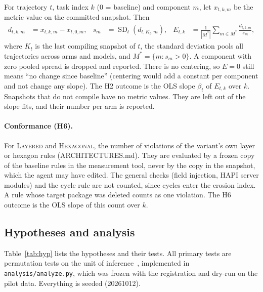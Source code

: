 \documentclass[10pt]{article}
\newcommand{\LAY}{\textsc{Layered}}
\newcommand{\HEX}{\textsc{Hexagonal}}
\newcommand{\code}[1]{\texttt{#1}}
\begin{document}
For trajectory $t$, task index $k$ (0 = baseline) and component $m$, let $x_{t,k,m}$ be the metric
value on the committed snapshot. Then
\begin{align}
d_{t,k,m} &= x_{t,k,m} - x_{t,0,m}, &
s_m &= \operatorname{SD}_t\!\left(d_{t,K_t,m}\right), &
E_{t,k} &= \frac{1}{|M^\ast|}\sum_{m\in M^\ast}\frac{d_{t,k,m}}{s_m},
\end{align}
where $K_t$ is the last compiling snapshot of $t$, the standard deviation pools all trajectories
across arms and models, and $M^\ast=\{m : s_m>0\}$. A component with zero pooled spread is dropped
and reported. There is no centering, so $E=0$ still means ``no change since baseline'' (centering
would add a constant per component and not change any slope). The H2 outcome is the OLS slope
$\beta_t$ of $E_{t,k}$ over $k$. Snapshots that do not compile have no metric values. They are left
out of the slope fits, and their number per arm is reported.

\paragraph{Conformance (H6).} For \LAY{} and \HEX{}, the number of violations of the variant's own
layer or hexagon rules (ARCHITECTURES.md). They are evaluated by a frozen copy of the baseline rules
in the measurement tool, never by the copy in the snapshot, which the agent may have edited. The
general checks (field injection, HAPI server modules) and the cycle rule are not counted, since
cycles enter the erosion index. A rule whose target package was deleted counts as one violation.
The H6 outcome is the OLS slope of this count over $k$.

\subsection{Hypotheses and analysis}\label{sec:analysis}

Table~\ref{tab:hyp} lists the hypotheses and their tests. All primary tests are permutation tests
on the unit of inference~\citep{good2005permutation}, implemented in \code{analysis/analyze.py},
which was frozen with the registration and dry-run on the pilot data. Everything is seeded
(20261012).
\end{document}
